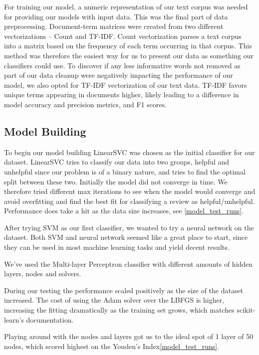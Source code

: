 \documentclass[twoside,twocolumn]{article}
\begin{document}
For training our model, a numeric representation of our text corpus was needed for providing our models with input data. This was the final part of data preprocessing. Document-term matrices were created from two different vectorizations – Count and TF-IDF. Count vectorization parses a text corpus into a matrix based on the frequency of each term occurring in that corpus. This method was therefore the easiest way for us to present our data as something our classifiers could use. To discover if any less informative words not removed as part of our data cleanup were negatively impacting the performance of our model, we also opted for TF-IDF vectorization of our text data. TF-IDF favors unique terms appearing in documents higher, likely leading to a difference in model accuracy and precision metrics, and F1 scores.

\subsection{Model Building}
To begin our model building LinearSVC was chosen as the initial classifier for our dataset. LinearSVC tries to classify our data into two groups, helpful and unhelpful since our problem is of a binary nature, and tries to find the optimal split between these two. Initially the model did not converge in time. We therefore tried different max iterations to see when the model would converge and avoid overfitting and find the best fit for classifying a review as helpful/unhelpful. Performance does take a hit as the data size increases, see \figurename{\ref{model_test_runs}}.

After trying SVM as our first classifier, we wanted to try a neural network on the dataset. Both SVM and neural network seemed like a great place to start, since they can be used in most machine learning tasks and yield decent results.

We've used the Multi-layer Perceptron classifier with different amounts of hidden layers, nodes and solvers.

During our testing the performance scaled positively as the size of the dataset increased. The cost of using the Adam solver over the LBFGS is higher, increasing the fitting dramatically as the training set grows, which matches scikit-learn's documentation\cite{sklearn:MLPClassifier}.

Playing around with the nodes and layers got us to the ideal spot of 1 layer of 50 nodes, which scored highest on the Youden's Index\ref{model_test_runs}.
\end{document}
